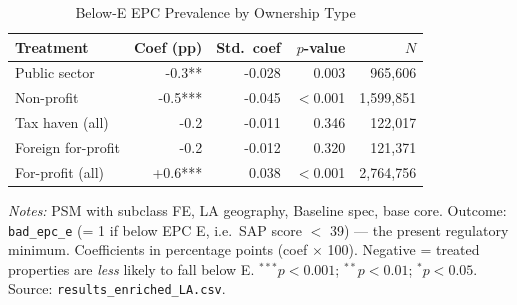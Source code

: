 \begin{table}[htbp]
\centering
\caption{Below-E EPC Prevalence by Ownership Type}
\label{tab:h2_bad_epc_e}
\begin{tabular}{lrrrr}
\toprule
Treatment & Coef (pp) & Std.\ coef & $p$-value & $N$ \\
\midrule
Public sector & -0.3** & -0.028 & 0.003 & 965,606 \\
Non-profit & -0.5*** & -0.045 & $<$0.001 & 1,599,851 \\
Tax haven (all) & -0.2 & -0.011 & 0.346 & 122,017 \\
Foreign for-profit & -0.2 & -0.012 & 0.320 & 121,371 \\
For-profit (all) & +0.6*** & 0.038 & $<$0.001 & 2,764,756 \\
\bottomrule
\end{tabular}
\begin{minipage}{0.9\textwidth}
\vspace{4pt}
\footnotesize
\textit{Notes:} PSM with subclass FE, LA geography, Baseline spec, base core.
Outcome: \texttt{bad\_epc\_e} (= 1 if below EPC E, i.e.\ SAP score $<$ 39) --- the present regulatory minimum.
Coefficients in percentage points (coef $\times$ 100).
Negative = treated properties are \textit{less} likely to fall below E.
$^{***}p<0.001$; $^{**}p<0.01$; $^{*}p<0.05$.
Source: \texttt{results\_enriched\_LA.csv}.
\end{minipage}
\end{table}
